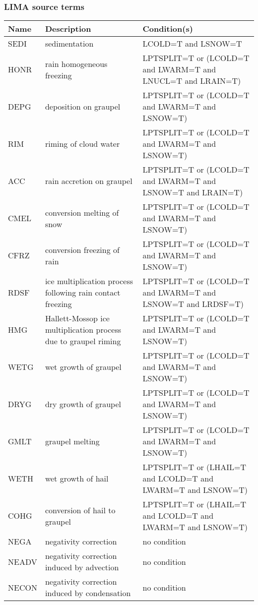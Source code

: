 \subsubsection{LIMA source terms}

\begin{longtable} {|p{}|p{}|p{}|}
\hline
Name & Description & Condition(s) \\
\hline \hline
\endhead
SEDI   & sedimentation                                 & LCOLD=T and LSNOW=T \\\hline
HONR   & rain homogeneous freezing                     & LPTSPLIT=T or (LCOLD=T and LWARM=T and LNUCL=T and LRAIN=T) \\\hline
DEPG   & deposition on graupel                         & LPTSPLIT=T or (LCOLD=T and LWARM=T and LSNOW=T) \\\hline
RIM    & riming of cloud water                         & LPTSPLIT=T or (LCOLD=T and LWARM=T and LSNOW=T) \\\hline
ACC    & rain accretion on graupel                     & LPTSPLIT=T or (LCOLD=T and LWARM=T and LSNOW=T and LRAIN=T) \\\hline
CMEL   & conversion melting of snow                    & LPTSPLIT=T or (LCOLD=T and LWARM=T and LSNOW=T) \\\hline
CFRZ   & conversion freezing of rain                   & LPTSPLIT=T or (LCOLD=T and LWARM=T and LSNOW=T) \\\hline
RDSF   & ice multiplication process following rain contact freezing & LPTSPLIT=T or (LCOLD=T and LWARM=T and LSNOW=T and LRDSF=T) \\\hline
HMG    & Hallett-Mossop ice multiplication process due to graupel riming & LPTSPLIT=T or (LCOLD=T and LWARM=T and LSNOW=T) \\\hline
WETG   & wet growth of graupel                         & LPTSPLIT=T or (LCOLD=T and LWARM=T and LSNOW=T) \\\hline
DRYG   & dry growth of graupel                         & LPTSPLIT=T or (LCOLD=T and LWARM=T and LSNOW=T) \\\hline
GMLT   & graupel melting                               & LPTSPLIT=T or (LCOLD=T and LWARM=T and LSNOW=T) \\\hline
WETH   & wet growth of hail                            & LPTSPLIT=T or (LHAIL=T and LCOLD=T and LWARM=T and LSNOW=T) \\\hline
COHG   & conversion of hail to graupel                 & LPTSPLIT=T or (LHAIL=T and LCOLD=T and LWARM=T and LSNOW=T) \\\hline
NEGA   & negativity correction                         & no condition \\\hline
NEADV  & negativity correction induced by advection    & no condition \\\hline
NECON  & negativity correction induced by condensation & no condition \\\hline
\end{longtable}

